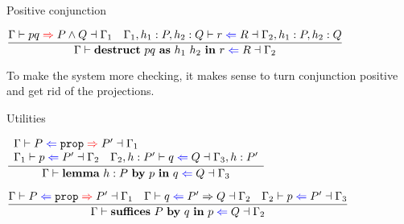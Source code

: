 
\begin{frame}{Positive conjunction}

\begin{center}
  $\infrule{\inferproof{\Gamma}{pq}{\And{P}{Q}}{\Gamma_1} \quad \checkproof{\assume{\assume{\Gamma_1}{h_1}{P}}{h_2}{Q}}{r}{R}{\assume{\assume{\Gamma_2}{h_1}{P}}{h_2}{Q}}}{\checkproof{\Gamma}{\destruct{pq}{h_1}{h_2}{r}}{R}{\Gamma_2}}$
\end{center}

\vspace{2em}

To make the system more checking, it makes sense to turn conjunction positive and get rid of the projections.

\end{frame}

\begin{frame}{Utilities}

\begin{center}
  $\infrule{\begin{array}{l} \checkprop{\Gamma}{P}{P'}{\Gamma_1} \\ \checkproof{\Gamma_1}{p}{P'}{\Gamma_2} \quad \checkproof{\assume{\Gamma_2}{h}{P'}}{q}{Q}{\assume{\Gamma_3}{h}{P'}} \end{array}}{\checkproof{\Gamma}{\lemma{h}{P}{p}{q}}{Q}{\Gamma_3}}$

  \vspace{2em}

  $\infrule{\checkprop{\Gamma}{P}{P'}{\Gamma_1} \quad \checkproof{\Gamma}{q}{\Impl{P'}{Q}}{\Gamma_2} \quad \checkproof{\Gamma_2}{p}{P'}{\Gamma_3}}{\checkproof{\Gamma}{\suffices{P}{q}{p}}{Q}{\Gamma_2}}$
\end{center}

\end{frame}

